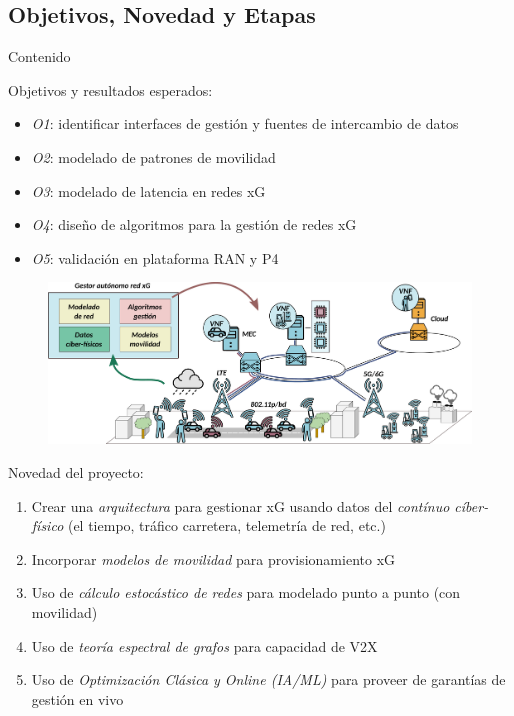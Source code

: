 \documentclass[xcolor=table,xcolor=x11names]{beamer}
\begin{document}
\subsection{Objetivos, Novedad y Etapas}
\begin{frame}[allowframebreaks]{Contenido}
    \tableofcontents[currentsubsection]
\end{frame}


\begin{frame}{\subsecname}
            Objetivos y resultados esperados:
            \begin{itemize}
                \item \emph{O1}: identificar interfaces de gestión y fuentes de intercambio de datos
                \item \emph{O2}: modelado de patrones de movilidad
                \item \emph{O3}: modelado de latencia en redes xG
                \item \emph{O4}: diseño de algoritmos para la gestión de redes xG
                \item \emph{O5}: validación en plataforma RAN y P4
            \end{itemize}
            \begin{figure}[t]
                \centering
                \includegraphics[width=.5\textwidth]{figures/big-picture-final-huge.pdf}
            \end{figure}
\end{frame}





\begin{frame}{\subsecname}
    Novedad del proyecto:
    \begin{enumerate}
        \item Crear una \emph{arquitectura} para
            gestionar xG usando datos del \emph{contínuo
            cíber-físico} (el tiempo, tráfico carretera,
            telemetría de red, etc.)
        \item Incorporar \emph{modelos de movilidad} para
            provisionamiento xG
        \item Uso de \emph{cálculo estocástico de redes}
            para modelado punto a punto (con movilidad)
        \item Uso de \emph{teoría espectral de grafos} para
            capacidad de V2X
        \item Uso de \emph{Optimización
            Clásica y Online (IA/ML)} para proveer
            de garantías de gestión en vivo
    \end{enumerate}
\end{frame}
\end{document}

